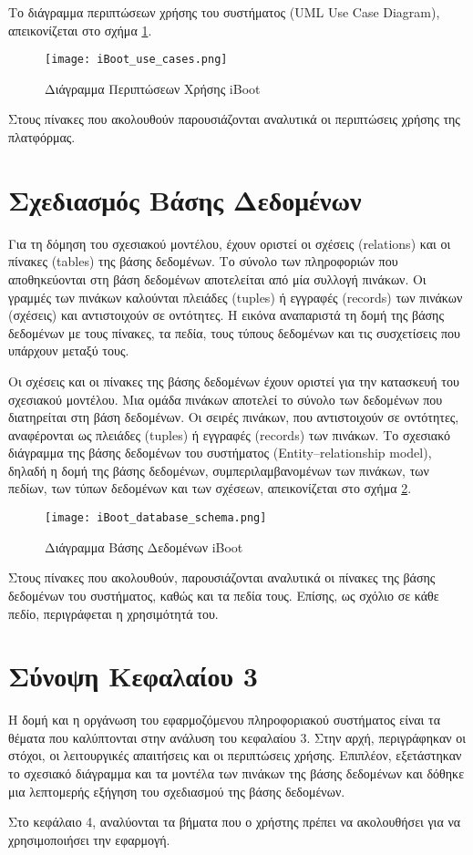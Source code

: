 Το διάγραμμα περιπτώσεων χρήσης του συστήματος (UML Use Case Diagram), απεικονίζεται στο σχήμα \ref{fig:iboot-use-cases}.

\begin{figure}[ht]
	\centering
	\texttt{[image: iBoot\_use\_cases.png]}
	\caption{Διάγραμμα Περιπτώσεων Χρήσης iBoot}
	\label{fig:iboot-use-cases}
\end{figure}

Στους πίνακες που ακολουθούν παρουσιάζονται αναλυτικά οι περιπτώσεις χρήσης της πλατφόρμας.

\FloatBarrier

\FloatBarrier

\section{Σχεδιασμός Βάσης Δεδομένων}
Για τη δόμηση του σχεσιακού μοντέλου, έχουν οριστεί οι σχέσεις (relations) και οι πίνακες (tables) της βάσης δεδομένων. Το σύνολο των πληροφοριών που αποθηκεύονται στη βάση δεδομένων αποτελείται από μία συλλογή πινάκων. Οι γραμμές των πινάκων καλούνται πλειάδες (tuples) ή εγγραφές (records) των πινάκων (σχέσεις) και αντιστοιχούν σε οντότητες. Η εικόνα αναπαριστά τη δομή της βάσης δεδομένων με τους πίνακες, τα πεδία, τους τύπους δεδομένων και τις συσχετίσεις που υπάρχουν μεταξύ τους.

Οι σχέσεις και οι πίνακες της βάσης δεδομένων έχουν οριστεί για την κατασκευή του σχεσιακού μοντέλου. Μια ομάδα πινάκων αποτελεί το σύνολο των δεδομένων που διατηρείται στη βάση δεδομένων. Οι σειρές πινάκων, που αντιστοιχούν σε οντότητες, αναφέρονται ως πλειάδες (tuples) ή εγγραφές (records) των πινάκων. Το σχεσιακό διάγραμμα της βάσης δεδομένων του συστήματος (Entity–relationship model), δηλαδή η δομή της βάσης δεδομένων, συμπεριλαμβανομένων των πινάκων, των πεδίων, των τύπων δεδομένων και των σχέσεων, απεικονίζεται στο σχήμα \ref{fig:iboot-db}.

\begin{figure}[h]
	\centering
	\texttt{[image: iBoot\_database\_schema.png]}
	\caption{Διάγραμμα Βάσης Δεδομένων iBoot}
	\label{fig:iboot-db}
\end{figure}

Στους πίνακες που ακολουθούν, παρουσιάζονται αναλυτικά οι πίνακες της βάσης δεδομένων του συστήματος, καθώς και τα πεδία τους. Επίσης, ως σχόλιο σε κάθε πεδίο, περιγράφεται η χρησιμότητά του.

\FloatBarrier

\FloatBarrier

\section{Σύνοψη Κεφαλαίου 3}
Η δομή και η οργάνωση του εφαρμοζόμενου πληροφοριακού συστήματος είναι τα θέματα που καλύπτονται στην ανάλυση του κεφαλαίου 3. Στην αρχή, περιγράφηκαν οι στόχοι, οι λειτουργικές απαιτήσεις και οι περιπτώσεις χρήσης. Επιπλέον, εξετάστηκαν το σχεσιακό διάγραμμα και τα μοντέλα των πινάκων της βάσης δεδομένων και δόθηκε μια λεπτομερής εξήγηση του σχεδιασμού της βάσης δεδομένων.

Στο κεφάλαιο 4, αναλύονται τα βήματα που ο χρήστης πρέπει να ακολουθήσει για να χρησιμοποιήσει την εφαρμογή.
